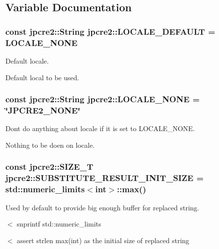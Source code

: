 \subsection{Variable Documentation}
\subsubsection[{\texorpdfstring{L\+O\+C\+A\+L\+E\+\_\+\+D\+E\+F\+A\+U\+LT}{LOCALE_DEFAULT}}]{\setlength{\rightskip}{0pt plus 5cm}const {\bf jpcre2\+::\+String} jpcre2\+::\+L\+O\+C\+A\+L\+E\+\_\+\+D\+E\+F\+A\+U\+LT = {\bf L\+O\+C\+A\+L\+E\+\_\+\+N\+O\+NE}}\hypertarget{namespacejpcre2_adfdd3d1fff99e685734ae4e59771e84d}{}\label{namespacejpcre2_adfdd3d1fff99e685734ae4e59771e84d}


Default locale. 

Default local to be used. 
\subsubsection[{\texorpdfstring{L\+O\+C\+A\+L\+E\+\_\+\+N\+O\+NE}{LOCALE_NONE}}]{\setlength{\rightskip}{0pt plus 5cm}const {\bf jpcre2\+::\+String} jpcre2\+::\+L\+O\+C\+A\+L\+E\+\_\+\+N\+O\+NE = \char`\"{}J\+P\+C\+R\+E2\+\_\+\+N\+O\+NE\char`\"{}}\hypertarget{namespacejpcre2_ad2236dcdcc14d580724b256ce7f168e5}{}\label{namespacejpcre2_ad2236dcdcc14d580724b256ce7f168e5}


Don\textquotesingle{}t do anything about locale if it is set to L\+O\+C\+A\+L\+E\+\_\+\+N\+O\+NE. 

Nothing to be doen on locale. 
\subsubsection[{\texorpdfstring{S\+U\+B\+S\+T\+I\+T\+U\+T\+E\+\_\+\+R\+E\+S\+U\+L\+T\+\_\+\+I\+N\+I\+T\+\_\+\+S\+I\+ZE}{SUBSTITUTE_RESULT_INIT_SIZE}}]{\setlength{\rightskip}{0pt plus 5cm}const {\bf jpcre2\+::\+S\+I\+Z\+E\+\_\+T} jpcre2\+::\+S\+U\+B\+S\+T\+I\+T\+U\+T\+E\+\_\+\+R\+E\+S\+U\+L\+T\+\_\+\+I\+N\+I\+T\+\_\+\+S\+I\+ZE = std\+::numeric\+\_\+limits$<$int$>$\+::max()}\hypertarget{namespacejpcre2_a80cb201f2e733137b22a8ed98465096a}{}\label{namespacejpcre2_a80cb201f2e733137b22a8ed98465096a}


Used by default to provide big enough buffer for replaced string. 

$<$ snprintf std\+::numeric\+\_\+limits

$<$ assert strlen max(int) as the initial size of replaced string 